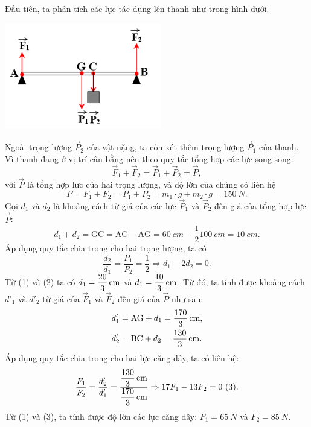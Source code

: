\begin{enumerate}[label=\bfseries Câu \arabic*:]
	\loigiai
	{ Đầu tiên, ta phân tích các lực tác dụng lên thanh như trong hình dưới. 
		\begin{center}
			\includegraphics[scale=1]{../figs/VN10-2021-PH-TP022-2.png}
		\end{center}
		Ngoài trọng lượng $\vec{P}_2$ của vật nặng, ta còn xét thêm trọng lượng $\vec{P}_1$ của thanh. Vì thanh đang ở vị trí cân bằng nên theo quy tắc tổng hợp các lực song song:
		\begin{equation*}
			\vec{F}_1+\vec{F}_2=\vec{P}_1+\vec{P}_2=\vec{P},
		\end{equation*}
		với $\vec{P}$ là tổng hợp lực của hai trọng lượng, 
		và độ lớn của chúng có liên hệ 
		\begin{equation*}
			P=F_1+F_2=P_1+P_2 = m_1\cdot g + m_2\cdot g = \SI{150}{N}. 
		\end{equation*}
		Gọi $d_1$ và $d_2$ là khoảng cách từ giá của các lực $\vec{P}_1$ và $\vec{P}_2$ đến giá của tổng hợp lực $\vec{P}$:
		\begin{equation*}
			d_1+d_2=\textrm{GC}=\textrm{AC}-\textrm{AG} = \SI{60}{cm}-\dfrac{1}{2}\SI{100}{cm}=\SI{10}{cm}.\tag{1} 
		\end{equation*}
		Áp dụng quy tắc chia trong cho hai trọng lượng, ta có
		\begin{equation*}
			\dfrac{d_2}{d_1}=\dfrac{P_1}{P_2}=\dfrac{1}{2}
			\Rightarrow
			d_1-2d_2=0. \tag{2}
		\end{equation*}
		Từ (1) và (2) ta có $d_1=\SI[parse-numbers=false]{\dfrac{20}{3}}{cm}$ và $d_1=\SI[parse-numbers=false]{\dfrac{10}{3}}{cm}$. 
		Từ đó, ta tính được khoảng cách $d'_1$ và $d'_2$ từ giá của $\vec{F}_1$ và $\vec{F}_2$ đến giá của $\vec{P}$ như sau:
		\begin{align*}
			d'_1&=\textrm{AG}+d_1=\SI[parse-numbers=false]{\dfrac{170}{3}}{cm},\\
			d'_2&=\textrm{BC}+d_2=\SI[parse-numbers=false]{\dfrac{130}{3}}{cm}.
		\end{align*}
		Áp dụng quy tắc chia trong cho hai lực căng dây, ta có liên hệ:
		\begin{align*}
			\dfrac{F_1}{F_2}=\dfrac{d'_2}{d'_1}
			=
			\dfrac{\SI[parse-numbers=false]{\dfrac{130}{3}}{cm}}{\SI[parse-numbers=false]{\dfrac{170}{3}}{cm}}
			\Rightarrow
			17F_1-13F_2=0\ (3). 
		\end{align*}
		Từ (1) và (3), ta tính được độ lớn các lực căng dây: $F_1=\SI{65}{N}$ và $F_2=\SI{85}{N}$. 
	}
\end{enumerate}